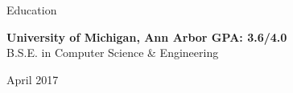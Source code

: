 \documentclass{resume}
\begin{document}

\bigskip
\vspace{-8mm}


\begin{rSection}{Education}

{\bf University of Michigan, Ann Arbor \hfill GPA: 3.6/4.0 \\}
B.S.E. in Computer Science \& Engineering \hfill \begin{em} April 2017 \end{em}\\

\vspace{-3mm}
\end{rSection}
\end{document}
